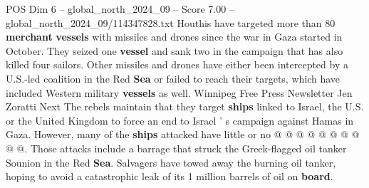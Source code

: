 \begin{textsample}{POS Dim 6 – global\_north\_2024\_09 – Score 7.00 – global\_north\_2024\_09/114347828.txt}
Houthis have targeted more than 80 \textbf{merchant} \textbf{vessels} with missiles and drones since the war in Gaza started in October.
They seized one \textbf{vessel} and sank two in the campaign that has also killed four sailors.
Other missiles and drones have either been intercepted by a U.S.-led coalition in the Red \textbf{Sea} or failed to reach their targets, which have included Western military \textbf{vessels} as well.
Winnipeg Free Press Newsletter Jen Zoratti Next The rebels maintain that they target \textbf{ships} linked to Israel, the U.S. or the United Kingdom to force an end to Israel ' s campaign against Hamas in Gaza.
However, many of the \textbf{ships} attacked have little or no @ @ @ @ @ @ @ @ @ @.
Those attacks include a barrage that struck the Greek-flagged oil tanker Sounion in the Red \textbf{Sea}.
Salvagers have towed away the burning oil tanker, hoping to avoid a catastrophic leak of its 1 million barrels of oil on \textbf{board}.

\end{textsample}
